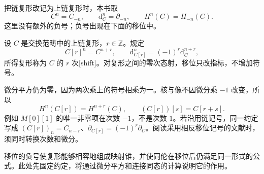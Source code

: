 把链复形改记为上链复形时，本书取
\[
C^n=C_{-n},\qquad \mathrm{d}_C^n=\partial_{-n},\qquad H^n(C)=H_{-n}(C).
\]
这里没有额外的负号；负号出现在下面的移位中。

\begin{definition}\label{b4:def:complex-shift}
设 \(C\) 是交换范畴中的上链复形，\(r\in\mathbb Z\)。规定
\[
C[r]^n=C^{n+r},\qquad \mathrm{d}_{C[r]}^n=(-1)^r \mathrm{d}_C^{n+r},
\]
所得复形称为 \(C\) 的 \(r\) 次[shift]。对复形之间的零次态射，移位只改指标，不增加符号。
\end{definition}

微分平方仍为零，因为两次乘上的符号相乘为一。核与像不因微分乘 \(-1\) 改变，所以
\[
H^n(C[r])=H^{n+r}(C),\qquad (C[r])[s]=C[r+s].
\]
例如 \(M[0][1]\) 的唯一非零项在次数 \(-1\)，不是次数 \(1\)。若沿用链记号，同一约定写成 \((C[r])_n=C_{n-r}\)、\(\partial_{C[r]}=(-1)^r\partial_C\)。阅读采用相反移位记号的文献时，须同时转换次数和微分。

\ProseParagraphBreak
移位的负号使复形能够相容地组成映射锥，并使同伦在移位后仍满足同一形式的公式。此处先固定约定，将通过微分平方和连接同态的计算说明它的作用。
